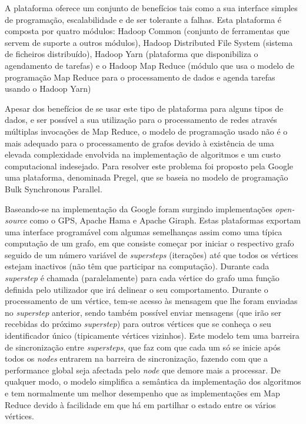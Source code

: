 A plataforma oferece um conjunto de benefícios tais como a sua interface simples de programação, escalabilidade e de ser tolerante a falhas.
Esta plataforma é composta por quatro módulos:
Hadoop Common (conjunto de ferramentas que servem de suporte a outros módulos),
Hadoop Distributed File System (sistema de ficheiros distribuído),
Hadoop Yarn (plataforma que disponibiliza o agendamento de tarefas)
e o Hadoop Map Reduce (módulo que usa o modelo de programação Map Reduce para o processamento de dados e agenda tarefas usando o Hadoop Yarn)

Apesar dos benefícios de se usar este tipo de plataforma para alguns tipos de dados, e ser possível a sua utilização para o processamento de redes através múltiplas invocações de Map Reduce, o modelo de programação usado  não é o mais adequado para o processamento de grafos devido à existência de  uma elevada complexidade envolvida na implementação de algoritmos e um custo computacional indesejado.
Para resolver este problema foi proposto pela Google uma plataforma, denominada Pregel\cite{pregel}, que se baseia no modelo de programação Bulk Synchronous Parallel\cite{bsp}.

Baseando-se na implementação da Google foram surgindo implementações \textit{open-source} como o GPS\cite{docgps}, Apache Hama\cite{hama} e Apache Giraph\cite{giraph}.
Estas plataformas exportam uma interface programável com algumas semelhanças assim como uma típica computação de um grafo, em que consiste começar por iniciar o respectivo grafo seguido de um número variável de \textit{supersteps} (iterações) até que todos os vértices estejam inactivos (não têm que participar na computação).
Durante cada \textit{superstep} é chamada (paralelamente) para cada vértice do grafo uma função definida pelo utilizador que irá delinear o seu comportamento.
Durante o processamento de um vértice, tem-se acesso às mensagem que lhe foram enviadas no \textit{superstep} anterior, sendo também possível enviar mensagens (que irão ser recebidas do próximo \textit{superstep}) para outros vértices que se conheça o seu identificador único (tipicamente vértices vizinhos).
Este modelo tem uma barreira de sincronização entre \textit{supersteps}, que faz com que cada um só se inicie após todos os \textit{nodes} entrarem na barreira de sincronização, fazendo com que a performance global seja afectada pelo \textit{node} que demore mais a processar.
De qualquer modo, o modelo simplifica a semântica da implementação dos algoritmos e tem normalmente um melhor desempenho que as implementações em Map Reduce devido à facilidade em que há em partilhar o estado entre os vários vértices. 


